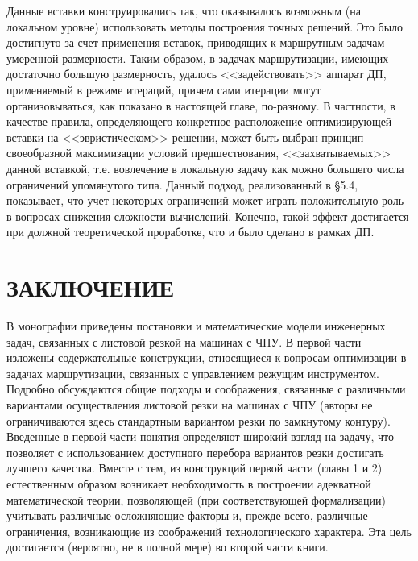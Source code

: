 \documentclass[11pt,twoside,openany]{report}
\begin{document}
{{Данные вставки конструировались так, что оказывалось возможным (на локальном уровне)
использовать методы построения точных решений. Это было достигнуто за счет применения
вставок, приводящих к маршрутным задачам умеренной размерности. Таким образом, в
задачах маршрутизации, имеющих достаточно большую размерность, удалось
<<задействовать>> аппарат ДП, применяемый в режиме итераций, причем сами итерации
могут организовываться, как показано в настоящей главе, по-разному. В частности, в
качестве правила, определяющего конкретное расположение оптимизирующей вставки на
<<эвристическом>> решении, может быть выбран принцип своеобразной максимизации условий
предшествования, <<захватываемых>> данной вставкой, т.е. вовлечение в локальную задачу
как можно большего числа ограничений упомянутого типа. Данный подход, реализованный
в \S 5.4, показывает, что учет некоторых ограничений может играть положительную роль
в вопросах снижения сложности вычислений. Конечно, такой эффект достигается при должной
теоретической проработке, что и было сделано в рамках ДП.

















\newpage
\section*{ЗАКЛЮЧЕНИЕ}

В монографии приведены постановки и математические модели инженерных задач, связанных с листовой резкой на машинах с ЧПУ. В первой части изложены содержательные конструкции, относящиеся к вопросам оптимизации в задачах маршрутизации, связанных с управлением режущим инструментом. Подробно обсуждаются общие подходы и соображения, связанные с различными вариантами осуществления листовой резки на машинах с ЧПУ (авторы не ограничиваются здесь стандартным вариантом резки по замкнутому контуру). Введенные в первой части понятия определяют широкий взгляд на задачу, что позволяет с использованием доступного перебора вариантов резки достигать лучшего качества. Вместе с тем, из конструкций первой части (главы 1 и 2) естественным образом возникает необходимость в построении адекватной математической теории, позволяющей (при соответствующей формализации) учитывать различные осложняющие факторы и, прежде всего, различные ограничения, возникающие из соображений технологического характера. Эта цель достигается (вероятно, не в полной мере) во второй части книги.

}}
\end{document}
